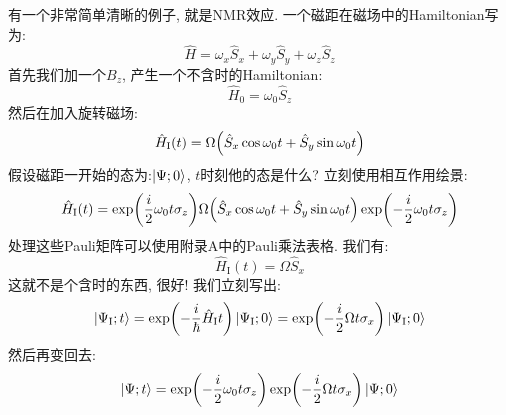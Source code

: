 有一个非常简单清晰的例子, 就是NMR效应.
一个磁距在磁场中的Hamiltonian写为:
\begin{equation}
	\hat{H} = \omega_x \hat{S}_x + \omega_y \hat{S}_y + \omega_z \hat{S}_z
\end{equation}
首先我们加一个$B_z$, 产生一个不含时的Hamiltonian:
\begin{equation}
	\hat{H}_0 = \omega_0 \hat{S}_z
\end{equation}
然后在加入旋转磁场:
\begin{equation}
	\hat{H}_{\text{I}}(t)=\Omega \pqty{\hat{S}_x\cos\omega_0t+\hat{S}_y\sin\omega_0t}
\end{equation}
假设磁距一开始的态为:$\ket{\Psi;0}$, $t$时刻他的态是什么?
立刻使用相互作用绘景:
\begin{equation}
	\hat{H}_{\text{I}}(t) = \exp(\frac{i}{2} \omega_0t \sigma_z )\Omega \pqty{\hat{S}_x\cos\omega_0t+\hat{S}_y\sin\omega_0t}\exp(-\frac{i}{2} \omega_0t \sigma_z )
\end{equation}
处理这些Pauli矩阵可以使用附录A中的Pauli乘法表格.
我们有:
\begin{equation}
	\hat{H}_{\text{I}}(t) = \Omega \hat{S}_x
\end{equation}
这就不是个含时的东西, 很好! 我们立刻写出:
\begin{equation}
	\ket{\Psi_{\text{I}};t} = \exp(-\frac{i}{\hbar}\hat{H}_{\text{I}} t )\ket{\Psi_{\text{I}};0} = \exp(-\frac{i}{2}\Omega t \sigma_x )\ket{\Psi_{\text{I}};0}
\end{equation}
然后再变回去:
\begin{equation}
	\ket{\Psi;t} = \exp(-\frac{i}{2}\omega_0 t \sigma_z )\exp(-\frac{i}{2}\Omega t \sigma_x )\ket{\Psi;0}
\end{equation}

